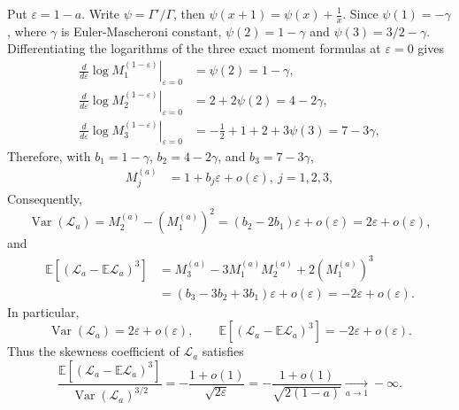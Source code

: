 \documentclass[11pt]{article}
\numberwithin{equation}{section}
\theoremstyle{remark}
\newcommand{\E}{\mathbb{E}}
\begin{document}
Put $\varepsilon=1-a$. Write $\psi=\Gamma'/\Gamma$, then $\psi(x+1)=\psi(x)+\frac1x$. Since $\psi(1)=-\gamma$, where $\gamma$ is Euler-Mascheroni constant,
$\psi(2)=1-\gamma$ and $\psi(3)=3/2-\gamma$. Differentiating the logarithms of
the three exact moment formulas at $\varepsilon=0$ gives
\begin{align*}
 \left.\frac{d}{d\varepsilon}\log M_1^{(1-\varepsilon)}\right|_{\varepsilon=0}
   &=\psi(2)=1-\gamma,\\
 \left.\frac{d}{d\varepsilon}\log M_2^{(1-\varepsilon)}\right|_{\varepsilon=0}
   &=2+2\psi(2)=4-2\gamma,\\
 \left.\frac{d}{d\varepsilon}\log M_3^{(1-\varepsilon)}\right|_{\varepsilon=0}
   &=-\frac12+1+2+3\psi(3)=7-3\gamma,
\end{align*}
Therefore, with $b_1=1-\gamma$, $b_2=4-2\gamma$, and $b_3=7-3\gamma$,
\begin{align}
 M_j^{(a)}&=1+b_j\varepsilon+o(\varepsilon), \ j=1,2,3, \label{eq:mexp}
\end{align}
Consequently,
\[
 \operatorname{Var}(\mathcal{L}_a)
 =M_2^{(a)}-(M_1^{(a)})^2
 =(b_2-2b_1)\varepsilon+o(\varepsilon)
 =2\varepsilon+o(\varepsilon),
\]
and
\begin{align*}
 \E[(\mathcal{L}_a-\E \mathcal{L}_a)^3]
 &=M_3^{(a)}-3M_1^{(a)}M_2^{(a)}+2(M_1^{(a)})^3\\
 &=(b_3-3b_2+3b_1)\varepsilon+o(\varepsilon) = -2\varepsilon+o(\varepsilon).
\end{align*}
In particular,
\begin{equation}\label{eq:central-asymptotics}
 \operatorname{Var}(\mathcal{L}_a)=2\varepsilon+o(\varepsilon),
 \qquad
 \E[(\mathcal{L}_a-\E \mathcal{L}_a)^3]=-2\varepsilon+o(\varepsilon).
\end{equation}
Thus the skewness coefficient of $\mathcal{L}_a$ satisfies
\begin{equation}\label{eq:skew-diverges}
 \frac{\E[(\mathcal{L}_a-\E \mathcal{L}_a)^3]}{\operatorname{Var}(\mathcal{L}_a)^{3/2}}
 =-\frac{1+o(1)}{\sqrt{2\varepsilon}} = -\frac{1+o(1)}{\sqrt{2(1-a)}}\xrightarrow[a \to 1]{} -\infty.
\end{equation}
\end{document}
